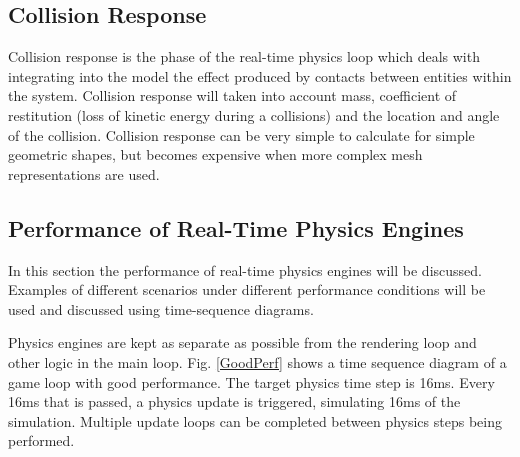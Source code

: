 

\subsection{Collision Response}

Collision response is the phase of the real-time physics loop which deals with integrating into the model the effect produced by contacts between entities within the system. Collision response will taken into account mass, coefficient of restitution (loss of kinetic energy during a collisions) and the location and angle of the collision. Collision response can be very simple to calculate for simple geometric shapes, but becomes expensive when more complex mesh representations are used.

\subsection{Performance of Real-Time Physics Engines}
In this section the performance of real-time physics engines will be discussed. Examples of different scenarios under different performance conditions will be used and discussed using time-sequence diagrams.

Physics engines are kept as separate as possible from the rendering loop and other logic in the main loop. Fig. \ref{GoodPerf} shows a time sequence diagram of a game loop with good performance. The target physics time step is 16ms. Every 16ms that is passed, a physics update is triggered, simulating 16ms of the simulation. Multiple update loops can be completed between physics steps being performed.

